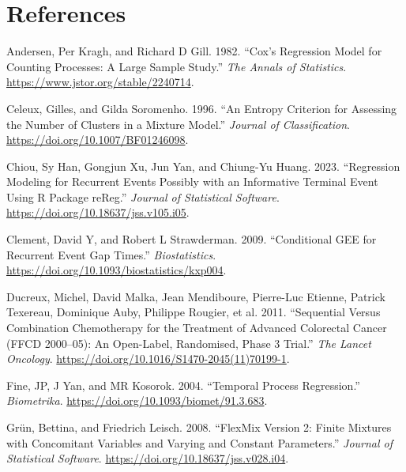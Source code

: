 \hypertarget{references}{%
\section*{References}\label{references}}

\hypertarget{refs}{}
\begin{CSLReferences}{1}{0}
\leavevmode{}%
Andersen, Per Kragh, and Richard D Gill. 1982. {``{Cox's} Regression Model for Counting Processes: A Large Sample Study.''} \emph{The Annals of Statistics}. \url{https://www.jstor.org/stable/2240714}.

\leavevmode{}%
Celeux, Gilles, and Gilda Soromenho. 1996. {``An Entropy Criterion for Assessing the Number of Clusters in a Mixture Model.''} \emph{Journal of Classification}. \url{https://doi.org/10.1007/BF01246098}.

\leavevmode{}%
Chiou, Sy Han, Gongjun Xu, Jun Yan, and Chiung-Yu Huang. 2023. {``Regression Modeling for Recurrent Events Possibly with an Informative Terminal Event Using {R} Package {reReg}.''} \emph{Journal of Statistical Software}. \url{https://doi.org/10.18637/jss.v105.i05}.

\leavevmode{}%
Clement, David Y, and Robert L Strawderman. 2009. {``Conditional {GEE} for Recurrent Event Gap Times.''} \emph{Biostatistics}. \url{https://doi.org/10.1093/biostatistics/kxp004}.

\leavevmode{}%
Ducreux, Michel, David Malka, Jean Mendiboure, Pierre-Luc Etienne, Patrick Texereau, Dominique Auby, Philippe Rougier, et al. 2011. {``Sequential Versus Combination Chemotherapy for the Treatment of Advanced Colorectal Cancer (FFCD 2000--05): An Open-Label, Randomised, Phase 3 Trial.''} \emph{The Lancet Oncology}. \url{https://doi.org/10.1016/S1470-2045(11)70199-1}.

\leavevmode{}%
Fine, JP, J Yan, and MR Kosorok. 2004. {``Temporal Process Regression.''} \emph{Biometrika}. \url{https://doi.org/10.1093/biomet/91.3.683}.

\leavevmode{}%
Grün, Bettina, and Friedrich Leisch. 2008. {``{FlexMix} Version 2: Finite Mixtures with Concomitant Variables and Varying and Constant Parameters.''} \emph{Journal of Statistical Software}. \url{https://doi.org/10.18637/jss.v028.i04}.


\end{CSLReferences}

